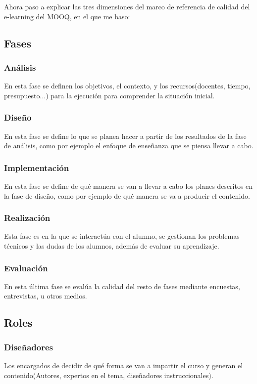Ahora paso a explicar las tres dimensiones del marco de referencia de calidad del e-learning del MOOQ\cite{stracke2018quality}, en el que me baso:
\subsection{Fases}

\subsubsection{Análisis}
En esta fase se definen los objetivos, el contexto, y los recursos(docentes, tiempo, presupuesto...) para la ejecución para comprender la situación inicial.

\subsubsection{Diseño}
En esta fase se define lo que se planea hacer a partir de los resultados de la fase de análisis, como por ejemplo el enfoque de enseñanza que se piensa llevar a cabo.

\subsubsection{Implementación}
En esta fase se define de qué manera se van a llevar a cabo los planes descritos en la fase de diseño, como por ejemplo de qué manera se va a producir el contenido.

\subsubsection{Realización}
Esta fase es en la que se interactúa con el alumno, se gestionan los problemas técnicos y las dudas de los alumnos, además de evaluar su aprendizaje.

\subsubsection{Evaluación}
En esta última fase se evalúa la calidad del resto de fases mediante encuestas, entrevistas, u otros medios.

\subsection{Roles}

\subsubsection{Diseñadores}
Los encargados de decidir de qué forma se van a impartir el curso y generan el contenido(Autores, expertos en el tema, diseñadores instruccionales). 

